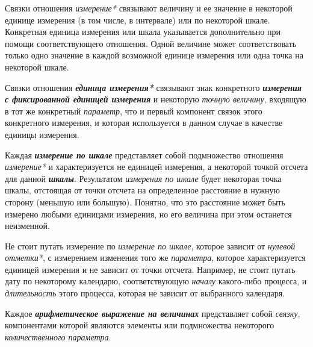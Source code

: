 \begin{SCn}
\begin{SCn}
Связки отношения \textit{измерение*} связывают величину и ее значение в некоторой единице измерения (в том числе, в интервале) или по некоторой шкале. Конкретная единица измерения или шкала указывается дополнительно при помощи соответствующего отношения. Одной величине может соответствовать только одно значение в каждой возможной единице измерения или одна точка на некоторой шкале.
	
	
\begin{SCn}
\end{SCn}

Связки отношения \textbf{\textit{единица измерения*}} связывают знак конкретного \textbf{\textit{измерения с фиксированной единицей измерения}} и некоторую \textit{точную величину}, входящую в тот же конкретный \textit{параметр}, что и первый компонент связок этого конкретного измерения, и которая используется в данном случае в качестве единицы измерения.
	
\begin{SCn}
\end{SCn}

Каждая \textbf{\textit{измерение по шкале}} представляет собой подмножество отношения \textit{измерение*} и характеризуется не единицей измерения, а некоторой точкой отсчета для данной \textbf{\textit{шкалы}}. Результатом \textit{измерения по шкале} будет некоторая точка шкалы, отстоящая от точки отсчета на определенное расстояние в нужную сторону (меньшую или большую). Понятно, что это расстояние может быть измерено любыми единицами измерения, но его величина при этом останется неизменной.
		
Не стоит путать измерение по \textit{измерение по шкале}, которое зависит от \textit{нулевой отметки*}, с измерением изменения того же \textit{параметра}, которое характеризуется единицей измерения и не зависит от точки отсчета. Например, не стоит путать дату по некоторому календарю, соответствующую \textit{началу} какого-либо процесса, и \textit{длительность} этого процесса, которая не зависит от выбранного календаря.

Каждое \textbf{\textit{арифметическое выражение на величинах}} представляет собой \textit{связку}, компонентами которой являются элементы или подмножества некоторого \textit{количественного параметра}.

\bigskip
\bigskip
\bigskip
\bigskip
\begin{SCn}
	

\end{SCn}
\end{SCn}
\end{SCn}
